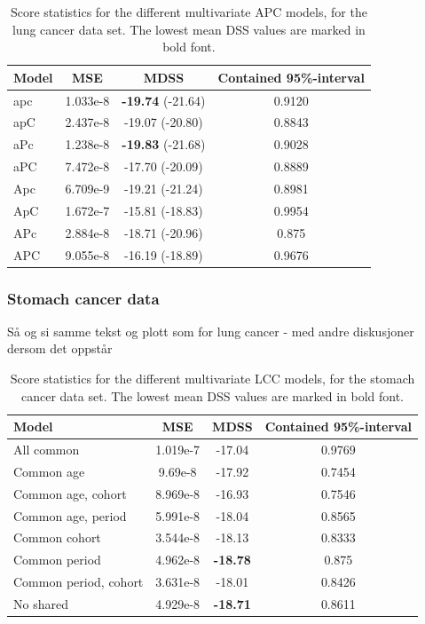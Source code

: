 \begin{table}[h!]
    \begin{tabular}{l |c c c }
        Model & MSE & MDSS & Contained 95\%-interval\\
        \hline
        apc    & 1.033e-8 & \textbf{-19.74} (-21.64)    & 0.9120 \\
        apC    & 2.437e-8 & -19.07 (-20.80)   & 0.8843 \\
        aPc    & 1.238e-8 & \textbf{-19.83} (-21.68)   & 0.9028 \\
        aPC    & 7.472e-8 & -17.70 (-20.09)   & 0.8889 \\
        Apc    & 6.709e-9 & -19.21 (-21.24)   & 0.8981 \\
        ApC    & 1.672e-7 & -15.81 (-18.83)   & 0.9954 \\
        APc    & 2.884e-8 & -18.71 (-20.96)   & 0.875  \\
        APC    & 9.055e-8 & -16.19 (-18.89)   & 0.9676 \\
    \end{tabular}
    \caption{\label{tab:APC-lung}Score statistics for the different multivariate APC models, for the lung cancer data set. The lowest mean DSS values are marked in bold font. }
\end{table}

\newpage
\subsubsection{Stomach cancer data}
\textcolor{myDarkGreen}{Så og si samme tekst og plott som for lung cancer - med andre diskusjoner dersom det oppstår}

\begin{table}[h!]
    \begin{tabular}{l |c c c }
        Model & MSE & MDSS & Contained 95\%-interval\\
        \hline
        All common            & 1.019e-7  & -17.04    & 0.9769 \\
        Common age            &  9.69e-8 & -17.92    & 0.7454 \\
        Common age, cohort    & 8.969e-8 & -16.93    & 0.7546 \\
        Common age, period    & 5.991e-8 & -18.04    & 0.8565 \\
        Common cohort         &  3.544e-8 & -18.13   & 0.8333 \\
        Common period         &  4.962e-8 & \textbf{-18.78}   & 0.875  \\
        Common period, cohort & 3.631e-8 & -18.01    & 0.8426 \\
        No shared             &  4.929e-8 & \textbf{-18.71}    & 0.8611 \\
    \end{tabular}
    \caption{\label{tab:LCC-stomach}Score statistics for the different multivariate LCC models, for the stomach cancer data set. The lowest mean DSS values are marked in bold font. }
\end{table}

